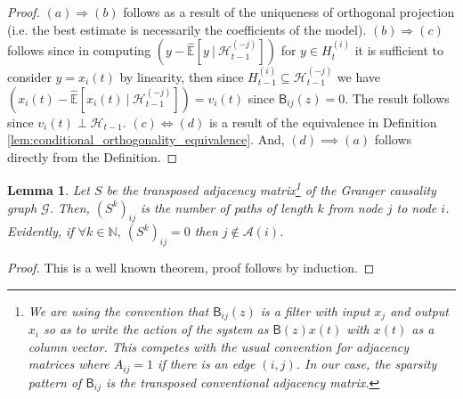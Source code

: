 \documentclass{statsoc}
\newcounter{lemma}
\newcounter{definition}
\def\gcg{\mathcal{G}}  %
\def\B{\mathsf{B}}  %
\def\H{\mathcal{H}}  %
\newcommand{\linE}[2]{\hat{\E}[#1\ |\ #2]}  %
\newcommand{\anc}[1]{\mathcal{A}(#1)}  %
\newtheorem{lemma}{Lemma}
\def\H{\mathcal{H}}  %
\def\E{\mathbb{E}}  %
\def\N{\mathbb{N}}  %
\begin{document}
\begin{proof}

  $(a) \Rightarrow (b)$ follows as a result of the uniqueness of orthogonal
  projection (i.e. the best estimate is necessarily the coefficients
  of the model).  $(b) \Rightarrow (c)$ follows since in computing
  $(y - \linE{y}{\H_{t - 1}^{(-j)}})$ for $y \in H_t^{(i)}$ it is sufficient
  to consider $y = x_i(t)$ by linearity, then since
  $H_{t - 1}^{(i)} \subseteq \H_{t - 1}^{(-j)}$ we have
  $(x_i(t) - \linE{x_i(t)}{\H_{t - 1}^{(-j)}}) = v_i(t)$ since
  $\B_{ij}(z) = 0$.  The result follows since
  $v_i(t) \perp \H_{t - 1}$.  $(c) \iff (d)$ is a result of the equivalence
  in Definition \ref{lem:conditional_orthogonality_equivalence}.  And,
  $(d) \implies (a)$ follows directly from the Definition.
\end{proof}

\begin{lemma}
  \label{lem:adj_matrix}
  Let $S$ be the transposed adjacency matrix\footnote{\footnotesize We
    are using the convention that $\B_{ij}(z)$ is a filter with input
    $x_j$ and output $x_i$ so as to write the action of the system as
    $\B(z)x(t)$ with $x(t)$ as a column vector.  This competes with
    the usual convention for adjacency matrices where $A_{ij} = 1$ if
    there is an edge $(i, j)$.  In our case, the sparsity pattern of
    $\B_{ij}$ is the \textit{transposed} conventional adjacency
    matrix.} of the Granger causality graph $\gcg$.  Then,
  $(S^k)_{ij}$ is the number of paths of length $k$ from node $j$ to
  node $i$.  Evidently, if $\forall k \in \N,\ (S^k)_{ij} = 0$ then
  $j \not\in \anc{i}$.
\end{lemma}
\begin{proof}
  This is a well known theorem, proof follows by induction.
\end{proof}
\end{document}
